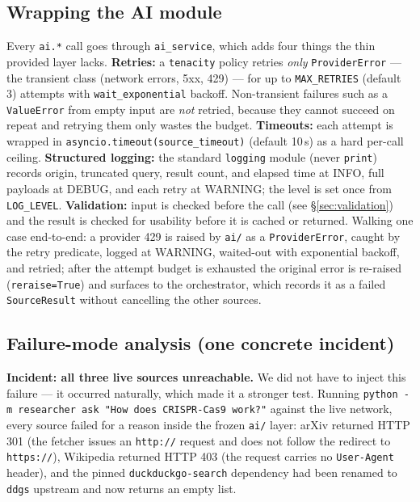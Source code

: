 \documentclass[11pt,a4paper]{article}
\begin{document}
\subsection{Wrapping the AI module}

Every \texttt{ai.*} call goes through \texttt{ai\_service}, which adds four things the thin
provided layer lacks. \textbf{Retries:} a \texttt{tenacity} policy retries \emph{only}
\texttt{ProviderError} --- the transient class (network errors, 5xx, 429) --- for up to
\texttt{MAX\_RETRIES} (default 3) attempts with \texttt{wait\_exponential} backoff.
Non-transient failures such as a \texttt{ValueError} from empty input are \emph{not} retried,
because they cannot succeed on repeat and retrying them only wastes the budget.
\textbf{Timeouts:} each attempt is wrapped in \texttt{asyncio.timeout(source\_timeout)}
(default 10\,s) as a hard per-call ceiling. \textbf{Structured logging:} the standard
\texttt{logging} module (never \texttt{print}) records origin, truncated query, result count,
and elapsed time at INFO, full payloads at DEBUG, and each retry at WARNING; the level is set
once from \texttt{LOG\_LEVEL}. \textbf{Validation:} input is checked before the call (see
\S\ref{sec:validation}) and the result is checked for usability before it is cached or
returned. Walking one case end-to-end: a provider 429 is raised by \texttt{ai/} as a
\texttt{ProviderError}, caught by the retry predicate, logged at WARNING, waited-out with
exponential backoff, and retried; after the attempt budget is exhausted the original error is
re-raised (\texttt{reraise=True}) and surfaces to the orchestrator, which records it as a
failed \texttt{SourceResult} without cancelling the other sources.

\subsection{Failure-mode analysis (one concrete incident)}

\textbf{Incident: all three live sources unreachable.} We did not have to inject this failure
--- it occurred naturally, which made it a stronger test. Running
\texttt{python -m researcher ask "How does CRISPR-Cas9 work?"} against the live network, every
source failed for a reason inside the frozen \texttt{ai/} layer: arXiv returned HTTP 301 (the
fetcher issues an \texttt{http://} request and does not follow the redirect to
\texttt{https://}), Wikipedia returned HTTP 403 (the request carries no \texttt{User-Agent}
header), and the pinned \texttt{duckduckgo-search} dependency had been renamed to \texttt{ddgs}
upstream and now returns an empty list.
\end{document}
